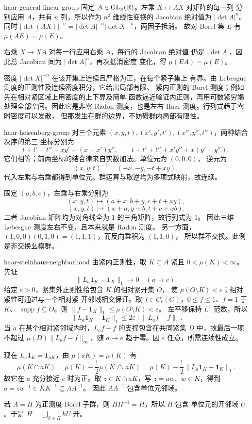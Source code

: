 \begin{solution}{haar-general-linear-group}
固定 $A\in\mathrm{GL}_n(\mathbb{R})$。左乘 $X\mapsto AX$ 对矩阵的每一列
分别应用 $A$，共有 $n$ 列，所以作为 $n^2$ 维线性变换的 Jacobian
绝对值为 $|\det A|^n$。同时
$|\det(AX)|^{-n}=|\det A|^{-n}|\det X|^{-n}$，两因子抵消。
故对 Borel 集 $E$ 有 $\mu(AE)=\mu(E)$。

右乘 $X\mapsto XA$ 对每一行应用右乘 $A$，每行的 Jacobian 绝对值
仍是 $|\det A|$，因此总 Jacobian 同为 $|\det A|^n$，再次抵消密度
变化，得 $\mu(EA)=\mu(E)$。

密度 $|\det X|^{-n}$ 在该开集上连续且严格为正，在每个紧子集上
有界。由 Lebesgue 测度的正则性及连续密度积分，它给出局部有限、
紧内正则的 Borel 测度；例如先在相对紧区域上用密度的上下界及简单
函数逼近验证内正则，再用可数紧穷竭处理全部空间。因此它是非零
Radon 测度，也是左右 Haar 测度。行列式趋于零时密度可以发散，
但那发生在群的边界，不妨碍群内局部有限性。
\end{solution}

\begin{solution}{haar-heisenberg-group}
对三个元素 $(x,y,t),(x',y',t'),(x'',y'',t'')$，两种结合次序的第三
坐标分别为
\[
 t+t'+t''+xy'+(x+x')y'',
 \qquad t+t'+t''+x'y''+x(y'+y''),
\]
它们相等；前两坐标的结合律来自实数加法。单位元为 $(0,0,0)$，
逆元为
\[
 (x,y,t)^{-1}=(-x,-y,-t+xy),
\]
代入左乘与右乘都得到单位元。群运算与取逆均为多项式映射，故连续。

固定 $(a,b,c)$，左乘与右乘分别为
\[
 (x,y,t)\mapsto(a+x,b+y,c+t+ay),
\]
\[
 (x,y,t)\mapsto(x+a,y+b,t+c+xb).
\]
二者 Jacobian 矩阵均为对角线全为 $1$ 的三角矩阵，故行列式为 $1$。
因此三维 Lebesgue 测度左右不变，且本来就是 Radon 测度。
另一方面，$(1,0,0)(0,1,0)=(1,1,1)$，而反向乘积为 $(1,1,0)$，
所以群不交换。此例是非交换幺模群。
\end{solution}

\begin{solution}{haar-steinhaus-neighborhood}
由紧内正则性，取 $K\subseteq A$ 紧且 $0<\mu(K)<\infty$。
先证
\[
 \|L_a\mathbf1_K-\mathbf1_K\|_1\longrightarrow0\quad(a\to e).
\]
给定 $\varepsilon>0$，紧集外正则性给包含 $K$ 的相对紧开集 $O$，
使 $\mu(O\setminus K)<\varepsilon$；相对紧性可通过与一个相对紧
开邻域相交保证。取 $f\in C_c(G)$，$0\le f\le1$、$f=1$ 于 $K$、
$\operatorname{supp}f\subseteq O$。则
$\|f-\mathbf1_K\|_1\le\mu(O\setminus K)<\varepsilon$。
左平移保持 $L^1$ 范数，所以
\[
 \|L_a\mathbf1_K-\mathbf1_K\|_1
 \le2\varepsilon+\|L_af-f\|_1.
\]
当 $a$ 在某个相对紧邻域内时，$L_af-f$ 的支撑包含在共同紧集 $D$
中，故最后一项不超过 $\mu(D)\|L_af-f\|_\infty$，随 $a\to e$
趋于零。因 $\varepsilon$ 任意，所需连续性成立。

现在 $L_a\mathbf1_K=\mathbf1_{aK}$，由
$\mu(aK)=\mu(K)$ 有
\[
 \mu(K\cap aK)
 =\mu(K)-\frac12\mu(K\mathbin{\triangle}aK)
 =\mu(K)-\frac12\|L_a\mathbf1_K-\mathbf1_K\|_1.
\]
故它在 $a$ 充分接近 $e$ 时为正。取 $z\in K\cap aK$，写
$z=aw$、$w\in K$，得到 $a=zw^{-1}\in KK^{-1}\subseteq AA^{-1}$。
因此 $AA^{-1}$ 包含单位元邻域。

若 $A=H$ 为正测度 Borel 子群，则 $HH^{-1}=H$，所以 $H$ 包含
单位元的开邻域 $U$。于是 $H=\bigcup_{h\in H}hU$ 开。
\end{solution}

